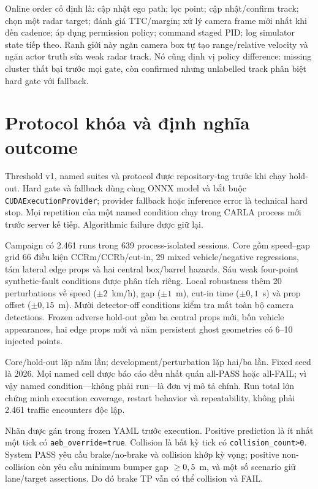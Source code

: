 \documentclass[conference]{IEEEtran}
\begin{document}
Online order cố định là: cập nhật ego path; lọc point; cập nhật/confirm track;
chọn một radar target; đánh giá TTC/margin; xử lý camera frame mới nhất khi đến
cadence; áp dụng permission policy; command staged PID; log simulator state tiếp
theo. Ranh giới này ngăn camera box tự tạo range/relative velocity và ngăn actor
truth sửa weak radar track. Nó cũng định vị policy difference: missing cluster
thất bại trước mọi gate, còn confirmed nhưng unlabelled track phân biệt hard gate
với fallback.

\section{Protocol khóa và định nghĩa outcome}
Threshold v1, named suites và protocol được repository-tag trước khi chạy
hold-out. Hard gate và fallback dùng cùng ONNX model và bắt buộc
\texttt{CUDAExecutionProvider}; provider fallback hoặc inference error là
technical hard stop. Mọi repetition của một named condition chạy trong CARLA
process mới trước server kế tiếp. Algorithmic failure được giữ lại.

Campaign có 2.461 runs trong 639 process-isolated sessions. Core gồm speed--gap
grid 66 điều kiện CCRm/CCRb/cut-in, 29 mixed vehicle/negative regressions, tám
lateral edge props và hai central box/barrel hazards. Sáu weak four-point
synthetic-fault conditions được phân tích riêng. Local robustness thêm 20
perturbations về speed ($\pm2$~km/h), gap ($\pm1$~m), cut-in time ($\pm0,1$~s)
và prop offset ($\pm0,15$~m). Mười detector-off conditions kiểm tra mất toàn bộ
camera detections. Frozen adverse hold-out gồm ba central props mới, bốn vehicle
appearances, hai edge props mới và năm persistent ghost geometries có 6--10
injected points.

Core/hold-out lặp năm lần; development/perturbation lặp hai/ba lần. Fixed seed là
2026. Mọi named cell được báo cáo đều nhất quán all-PASS hoặc all-FAIL; vì vậy
named condition---không phải run---là đơn vị mô tả chính. Run total lớn chứng
minh execution coverage, restart behavior và repeatability, không phải 2.461
traffic encounters độc lập.

Nhãn được gán trong frozen YAML trước execution. Positive prediction là ít nhất
một tick có \texttt{aeb\_override=true}. Collision là bất kỳ tick có
\texttt{collision\_count>0}. System PASS yêu cầu brake/no-brake và collision
khớp kỳ vọng; positive non-collision còn yêu cầu minimum bumper gap $\geq0,5$~m,
và một số scenario giữ lane/target assertions. Do đó brake TP vẫn có thể collision
và FAIL.
\end{document}

